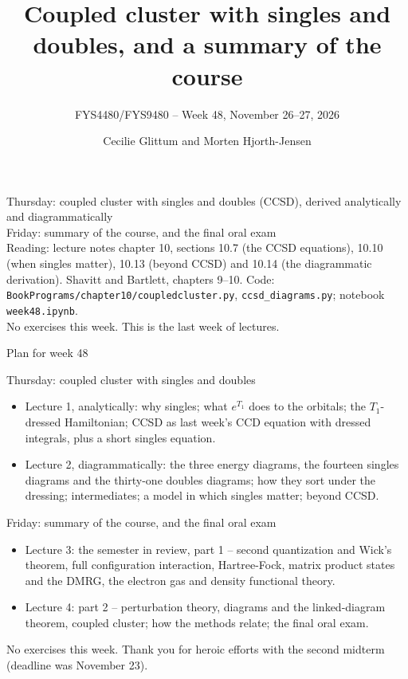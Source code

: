 \documentclass[aspectratio=169,10pt]{beamer}
\title{Coupled cluster with singles and doubles, and a summary of the course}
\subtitle{FYS4480/FYS9480 -- Week 48, November 26--27, 2026}
\author{Cecilie Glittum and Morten Hjorth-Jensen}
\institute{Department of Physics,\\
University of Oslo, Norway}
\date{}
\begin{document}
\begin{frame}[plain]
  \vfill
  \begin{center}\small
  Thursday: coupled cluster with singles and doubles (CCSD), derived analytically and diagrammatically\\
  Friday: summary of the course, and the final oral exam\\[0.55em]
  {\footnotesize Reading: lecture notes chapter 10, sections 10.7 (the CCSD equations), 10.10 (when singles matter), 10.13 (beyond CCSD) and 10.14 (the diagrammatic derivation). Shavitt and Bartlett, chapters 9--10. Code: \texttt{BookPrograms/chapter10/coupledcluster.py}, \texttt{ccsd\_diagrams.py}; notebook \texttt{week48.ipynb}.\\[0.2em]
  No exercises this week. This is the last week of lectures.}
  \end{center}
\end{frame}

\begin{frame}[shrink=3]{Plan for week 48}
\small
\begin{block}{Thursday: coupled cluster with singles and doubles}
\begin{itemize}
\item Lecture 1, analytically: why singles; what $e^{T_1}$ does to the orbitals; the $T_1$-dressed Hamiltonian; CCSD as last week's CCD equation with dressed integrals, plus a short singles equation.
\item Lecture 2, diagrammatically: the three energy diagrams, the fourteen singles diagrams and the thirty-one doubles diagrams; how they sort under the dressing; intermediates; a model in which singles matter; beyond CCSD.
\end{itemize}
\end{block}
\begin{block}{Friday: summary of the course, and the final oral exam}
\begin{itemize}
\item Lecture 3: the semester in review, part 1 -- second quantization and Wick's theorem, full configuration interaction, Hartree-Fock, matrix product states and the DMRG, the electron gas and density functional theory.
\item Lecture 4: part 2 -- perturbation theory, diagrams and the linked-diagram theorem, coupled cluster; how the methods relate; the final oral exam.
\end{itemize}
\end{block}
\small No exercises this week. Thank you for heroic efforts with the second midterm (deadline was November 23).
\end{frame}
\end{document}
